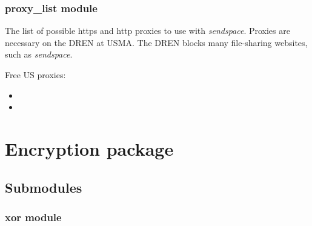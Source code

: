 \documentclass[letterpaper,12pt,openany,oneside]{sphinxmanual}
\begin{document}
\subsubsection{proxy\_list module}
\label{Web_Connection:proxy-list-module}\label{Web_Connection:module-webStegFS.Web_Connection.proxy_list}
The list of possible https and http proxies to use with \emph{sendspace}. Proxies are necessary on the DREN at USMA.
The DREN blocks many file-sharing websites, such as \emph{sendspace}.

Free US proxies:
\begin{itemize}
\item {} 

\item {} 

\end{itemize}


\section{Encryption package}
\label{Encryption::doc}\label{Encryption:encryption-package}

\subsection{Submodules}
\label{Encryption:submodules}

\subsubsection{xor module}
\label{Encryption:module-webStegFS.Encryption.xor}\label{Encryption:xor-module}
\end{document}
